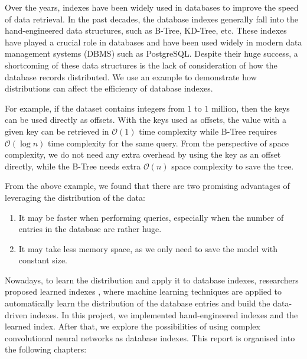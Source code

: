Over the years, indexes have been widely used in databases to improve the speed of data retrieval. In the past decades, the database indexes generally fall into the hand-engineered data structures, such as B-Tree, KD-Tree, etc. These indexes have played a crucial role in databases and have been used widely in modern data management systems (DBMS) such as PostgreSQL. Despite their huge success, a shortcoming of these data structures is the lack of consideration of how the database records distributed. We use an example to demonstrate how distributions can affect the efficiency of database indexes.

\begin{mscexample}
	For example, if the dataset contains integers from $1$ to $1$ million, then the keys can be used directly as offsets. With the keys used as offsets, the value with a given key can be retrieved in $\mathcal{O}(1)$ time complexity while B-Tree requires $\mathcal{O}(\log n)$ time complexity for the same query. From the perspective of space complexity, we do not need any extra overhead by using the key as an offset directly, while the B-Tree needs extra $\mathcal{O}(n)$ space complexity to save the tree.
\end{mscexample}

From the above example, we found that there are two promising advantages of leveraging the distribution of the data:
\begin{enumerate}
  \item It may be faster when performing queries, especially when the number of entries in the database are rather huge.
  \item It may take less memory space, as we only need to save the model with constant size.
  \end{enumerate}

Nowadays, to learn the distribution and apply it to database indexes, researchers proposed learned indexes \cite{kraska2018case}, where machine learning techniques are applied to automatically learn the distribution of the database entries and build the data-driven indexes. In this project, we implemented hand-engineered indexes and the learned index. After that, we explore the possibilities of using complex convolutional neural networks as database indexes. This report is organised into the following chapters:

